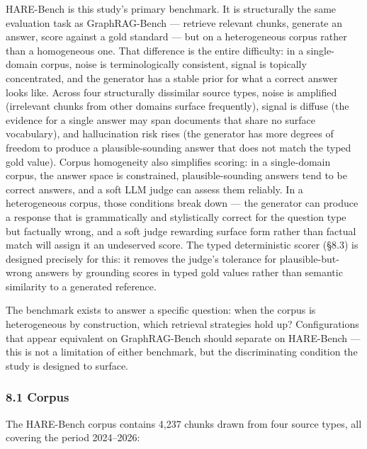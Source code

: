 \documentclass[
]{article}
\begin{document}
HARE-Bench is this study's primary benchmark. It is structurally the
same evaluation task as GraphRAG-Bench --- retrieve relevant chunks,
generate an answer, score against a gold standard --- but on a
heterogeneous corpus rather than a homogeneous one. That difference is
the entire difficulty: in a single-domain corpus, noise is
terminologically consistent, signal is topically concentrated, and the
generator has a stable prior for what a correct answer looks like.
Across four structurally dissimilar source types, noise is amplified
(irrelevant chunks from other domains surface frequently), signal is
diffuse (the evidence for a single answer may span documents that share
no surface vocabulary), and hallucination risk rises (the generator has
more degrees of freedom to produce a plausible-sounding answer that does
not match the typed gold value). Corpus homogeneity also simplifies
scoring: in a single-domain corpus, the answer space is constrained,
plausible-sounding answers tend to be correct answers, and a soft LLM
judge can assess them reliably. In a heterogeneous corpus, those
conditions break down --- the generator can produce a response that is
grammatically and stylistically correct for the question type but
factually wrong, and a soft judge rewarding surface form rather than
factual match will assign it an undeserved score. The typed
deterministic scorer (§8.3) is designed precisely for this: it removes
the judge's tolerance for plausible-but-wrong answers by grounding
scores in typed gold values rather than semantic similarity to a
generated reference.

The benchmark exists to answer a specific question: when the corpus is
heterogeneous by construction, which retrieval strategies hold up?
Configurations that appear equivalent on GraphRAG-Bench should separate
on HARE-Bench --- this is not a limitation of either benchmark, but the
discriminating condition the study is designed to surface.

\subsubsection{8.1 Corpus}\label{corpus}

The HARE-Bench corpus contains 4,237 chunks drawn from four source
types, all covering the period 2024--2026:
\end{document}
